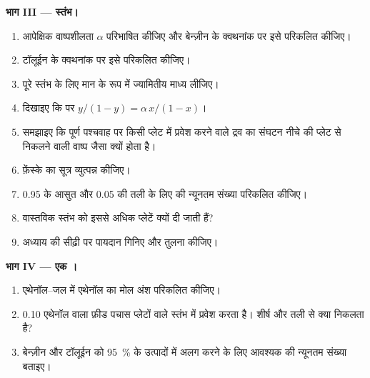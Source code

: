 \begin{problem}
\medskip
\noindent\textbf{भाग III --- स्तंभ।}
\begin{enumerate}[resume]
  \item आपेक्षिक वाष्पशीलता $\alpha$ परिभाषित कीजिए और बेन्ज़ीन के क्वथनांक
        पर इसे परिकलित कीजिए।
  \item टॉलूईन के क्वथनांक पर इसे परिकलित कीजिए।
  \item पूरे स्तंभ के लिए मान के रूप में ज्यामितीय माध्य लीजिए।
  \item दिखाइए कि  पर $y/(1 - y) = \alpha\,x/(1 - x)$।
  \item समझाइए कि पूर्ण पश्चवाह पर किसी प्लेट में प्रवेश करने वाले द्रव का
        संघटन नीचे की प्लेट से निकलने वाली वाष्प जैसा क्यों होता है।
  \item फ़ेंस्के का सूत्र व्युत्पन्न कीजिए।
  \item 0.95 के आसुत और 0.05 की तली के लिए  की न्यूनतम संख्या
        परिकलित कीजिए।
  \item वास्तविक स्तंभ को इससे अधिक प्लेटें क्यों दी जाती हैं?
  \item अध्याय की सीढ़ी पर पायदान गिनिए और तुलना कीजिए।
\end{enumerate}

\medskip
\noindent\textbf{भाग IV --- एक ।}
\begin{enumerate}[resume]
  \item एथेनॉल--जल  में एथेनॉल का मोल अंश परिकलित कीजिए।
  \item 0.10 एथेनॉल वाला फ़ीड पचास प्लेटों वाले स्तंभ में प्रवेश करता है। शीर्ष और
        तली से क्या निकलता है?
  \item बेन्ज़ीन और टॉलूईन को 95~\% के उत्पादों में अलग करने के लिए आवश्यक
         की न्यूनतम संख्या बताइए।
\end{enumerate}
\end{problem}
